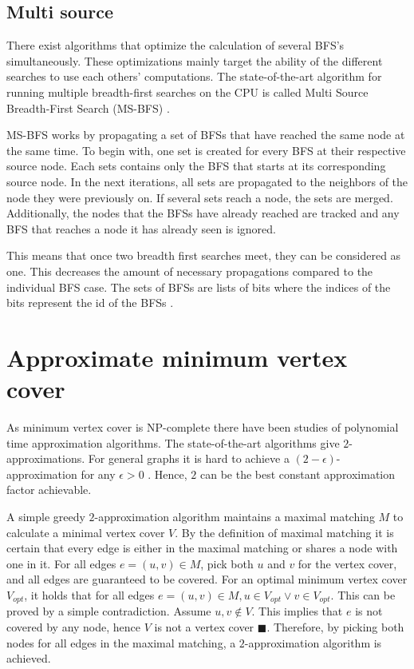 \subsection{Multi source}
There exist algorithms that optimize the calculation of several BFS's simultaneously. These optimizations mainly target the ability of the different searches to use each others' computations. The state-of-the-art algorithm for running multiple breadth-first searches on the CPU is called Multi Source Breadth-First Search (MS-BFS) \cite{msbfs}.

MS-BFS works by propagating a set of BFSs that have reached the same node at the same time. To begin with, one set is created for every BFS at their respective source node. Each sets contains only the BFS that starts at its corresponding source node. In the next iterations, all sets are propagated to the neighbors of the node they were previously on. If several sets reach a node, the sets are merged. Additionally, the nodes that the BFSs have already reached are tracked and any BFS that reaches a node it has already seen is ignored. 

This means that once two breadth first searches meet, they can be considered as one. This decreases the amount of necessary propagations compared to the individual BFS case. The sets of BFSs are lists of bits where the indices of the bits represent the id of the BFSs \cite{msbfs}.

\section{Approximate minimum vertex cover}
As minimum vertex cover is NP-complete there have been studies of polynomial time approximation algorithms. The state-of-the-art algorithms give $2$-approximations. For general graphs it is hard to achieve a $(2-\epsilon)$-approximation for any $\epsilon > 0$ \cite{2-evchard}. Hence, $2$ can be the best constant approximation factor achievable.

A simple greedy $2$-approximation algorithm maintains a maximal matching $M$ to calculate a minimal vertex cover $V$. By the definition of maximal matching it is certain that every edge is either in the maximal matching or shares a node with one in it. For all edges $e = (u,v) \in M$, pick both $u$ and $v$ for the vertex cover, and all edges are guaranteed to be covered. For an optimal minimum vertex cover $V_{opt}$, it holds that for all edges $e = (u,v) \in M, u \in V_{opt} \vee v \in V_{opt}$. This can be proved by a simple contradiction. Assume $u,v \notin V$. This implies that $e$ is not covered by any node, hence $V$ is not a vertex cover $\blacksquare$. Therefore, by picking both nodes for all edges in the maximal matching, a $2$-approximation algorithm is achieved.

